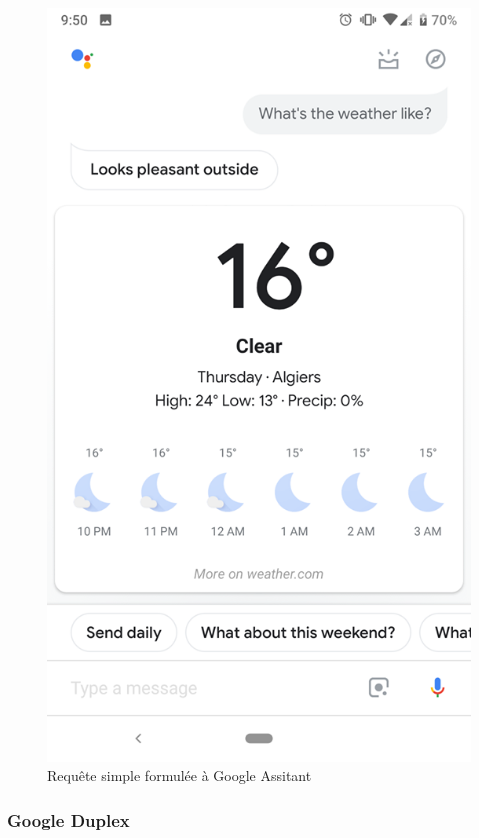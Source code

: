 \begin{figure}[h]
\begin{minipage}[b]{.45\textwidth}
	\end{minipage}
	\hspace{0.5cm}
	\begin{minipage}[b]{.45\textwidth}
		\centering
		\includegraphics[width=.85\linewidth]{images/google_assitant/weather.png} 
		\caption{Requête simple formulée à Google Assitant} 
	\end{minipage}
\end{figure}


\subsubsection*{Google Duplex}\label{duplex}

